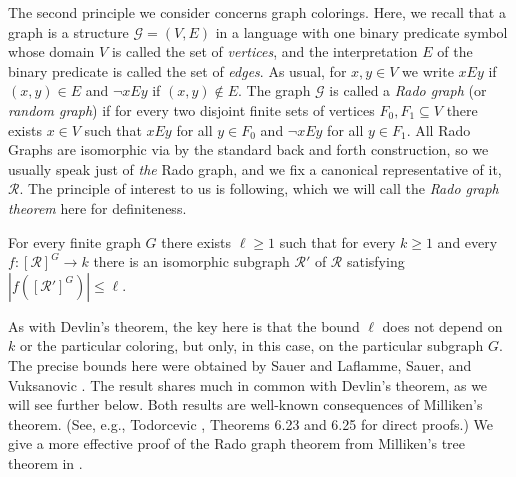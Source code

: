 The second principle we consider concerns graph colorings. Here, we recall that a graph is a structure $\mathcal{G} = (V,E)$ in a language with one binary predicate symbol whose domain $V$ is called the set of \emph{vertices}, and the interpretation $E$ of the binary predicate is called the set of \emph{edges}. As usual, for $x,y \in V$ we write $xEy$ if $(x,y) \in E$ and $\lnot x E y$ if $(x,y) \notin E$. The graph $\mathcal{G}$ is called a \emph{Rado graph} (or \emph{random graph}) if for every two disjoint finite sets of vertices $F_0,F_1 \subseteq V$ there exists $x \in V$ such that $xEy$ for all $y \in F_0$ and $\lnot x E y$ for all $y \in F_1$. All Rado Graphs are isomorphic via by the standard back and forth construction, so we usually speak just of \emph{the} Rado graph, and we fix a canonical representative of it, $\mathcal{R}$. The principle of interest to us is following, which we will call the \emph{Rado graph theorem} here for definiteness.
\begin{theorem}
	For every finite graph $G$ there exists $\ell \geq 1$ such that for every $k \geq 1$ and every $f : [\mathcal{R}]^G \to k$ there is an isomorphic subgraph $\mathcal{R}'$ of $\mathcal{R}$ satisfying $|f ([\mathcal{R}']^G)| \leq \ell$.
\end{theorem}
\noindent As with Devlin's theorem, the key here is that the bound $\ell$ does not depend on $k$ or the particular coloring, but only, in this case, on the particular subgraph $G$. The precise bounds here were obtained by Sauer \cite{Sauer2006} and Laflamme, Sauer, and Vuksanovic \cite{LSV2006}. The result shares much in common with Devlin's theorem, as we will see further below. Both results are well-known consequences of Milliken's theorem. (See, e.g., Todorcevic \cite{Todorcevic2010Ramsey}, Theorems 6.23 and 6.25 for direct proofs.) We give a more effective proof of the Rado graph theorem from Milliken's tree theorem in .

